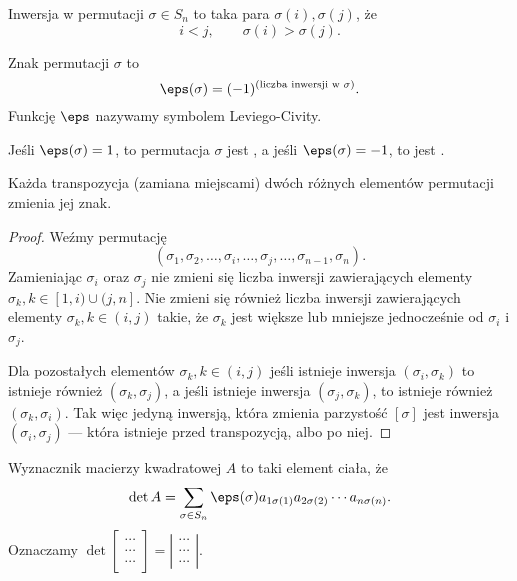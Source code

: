 \begin{definition}
    Inwersja w permutacji $\sigma \in S_n$ to taka para $\sigma(i), \sigma(j)$, że
    \[ i < j, \qquad \sigma(i) > \sigma(j). \]
\end{definition}

\begin{definition}
    Znak permutacji $\sigma$ to
    \[ \eps(\sigma) = (-1)^{(\text{liczba inwersji w } \sigma)}. \]
    Funkcję $\eps$ nazywamy symbolem Leviego-Civity.
\end{definition}

Jeśli $\eps(\sigma) = 1$, to permutacja $\sigma$ jest , a jeśli  $\eps(\sigma) = -1$, to jest .

\begin{fact}
    \label{f:sign of transposition}
    Każda transpozycja (zamiana miejscami) dwóch różnych elementów permutacji zmienia jej znak.
\end{fact}
\begin{proof}
    Weźmy permutację
    \[ (\sigma_1, \sigma_2, \ldots, \sigma_i, \ldots, \sigma_j, \ldots, \sigma_{n-1}, \sigma_n). \]
    Zamieniając $\sigma_i$ oraz $\sigma_j$ nie zmieni się liczba inwersji zawierających elementy $\sigma_k, k \in [1,i)\cup(j,n]$. Nie zmieni się również liczba inwersji zawierających elementy $\sigma_k, k \in (i,j)$ takie, że $\sigma_k$ jest większe lub mniejsze jednocześnie od $\sigma_i$ i $\sigma_j$.

    Dla pozostałych elementów $\sigma_k, k \in (i, j)$ jeśli istnieje inwersja $(\sigma_i, \sigma_k)$ to istnieje również $(\sigma_k, \sigma_j)$, a jeśli istnieje inwersja $(\sigma_j, \sigma_k)$, to istnieje również $(\sigma_k, \sigma_i)$. Tak więc jedyną inwersją, która zmienia parzystość $[\sigma]$ jest inwersja $(\sigma_i, \sigma_j)$ --- która istnieje przed transpozycją, albo po niej.
\end{proof}

\begin{definition}
    \label{d:determinant}
    Wyznacznik macierzy kwadratowej $A$ to taki element ciała, że
    \[ \det A = \sum_{\sigma\in S_n} \eps(\sigma)a_{1\sigma(1)}a_{2\sigma(2)}\cdots a_{n\sigma(n)}. \]
    Oznaczamy $\det
    \left[\begin{smallmatrix}
        \cdots \\ \cdots \\ \cdots
    \end{smallmatrix}\right] =
    \left|\begin{smallmatrix}
        \cdots \\ \cdots \\ \cdots
    \end{smallmatrix}\right|$.
\end{definition}

